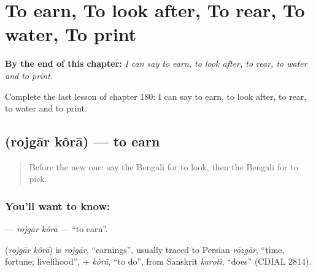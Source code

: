 
\chapter{To earn, To look after, To rear, To water, To print}
\label{ch:bn-to-earn-to-look-after-to-rear-to-water-to-print}

\begin{chapteropening}
\textbf{By the end of this chapter:} \emph{I can say to earn, to look after, to rear, to water and to print.}

Complete the last lesson of chapter 180: I can say to earn, to look after, to rear, to water and to print.
\end{chapteropening}

\section[\texorpdfstring{\bn{রোজগার} \bn{করা} (rojgār kôrā)}{রোজগার করা (rojgār kôrā)}]{  (rojgār kôrā) — to earn}

\label{lesson:BN-C180-rojgar-kora}



\begin{quote}
Before the new one: say the Bengali for to look, then the Bengali for to pick.
\end{quote}

\subsection*{You'll want to know:  }
\textbf{ } — \emph{rojgār kôrā} — \textquotedblleft{}to earn\textquotedblright{}.

\begin{cousinweb}
\textbf{ } (\emph{rojgār kôrā}) is \emph{rojgār}, \textquotedblleft{}earnings\textquotedblright{}, usually traced to Persian \emph{rōzgār}, \textquotedblleft{}time, fortune; livelihood\textquotedblright{}, + \emph{kôrā}, \textquotedblleft{}to do\textquotedblright{}, from Sanskrit \emph{karoti}, \textquotedblleft{}does\textquotedblright{} (CDIAL 2814).
\end{cousinweb}

